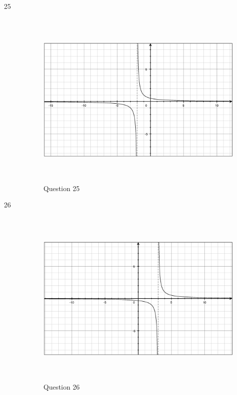 \documentclass[fleqn,addpoints]{exam}
\begin{document}
\begin{description}
\item[25]
\begin{figure}[H]
  \centering
  \includegraphics[width=12.25cm,height=8.75cm]{question25.eps}
  \caption*{Question 25}
\end{figure}

\item[26]
\begin{figure}[H]
  \centering
  \includegraphics[width=12.25cm,height=8.75cm]{question26.eps}
  \caption*{Question 26}
\end{figure}


\end{description}
\end{document}
